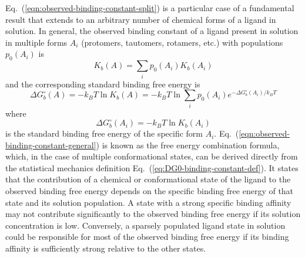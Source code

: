 \documentclass[9pt,bestpractices]{livecoms}
\begin{document}
Eq.~(\ref{eqn:observed-binding-constant-split}) is a particular case of a fundamental result that extends to an arbitrary number of chemical forms of a ligand in solution. In general, the observed binding constant of a ligand present in solution in multiple forms $A_i$ (protomers, tautomers, rotamers, etc.) with populations $p_0(A_i)$ is\cite{khuttan2023taming}
\begin{equation}
  K_b(A) = \sum_i p_0(A_i) K_b(A_i)
  \label{eqn:observed-binding-constant-general}
\end{equation}
and the corresponding standard binding free energy is
\begin{equation}
 \Delta G^\circ_b(A) = -k_B T \ln K_b(A) = -k_B T \ln \sum_i p_0(A_i) e^{-\Delta G^\circ_b(A_i)/k_B T}
  \label{eqn:observed-binding-free-energy-general}
\end{equation}
where
\begin{equation}
\Delta G^\circ_b(A_i) = -k_B T \ln K_b(A_i)
\end{equation}
is the standard binding free energy of the specific form $A_i$. Eq.~(\ref{eqn:observed-binding-constant-general}) is known as the free energy combination formula, which, in the case of multiple conformational states, can be derived directly from the statistical mechanics definition Eq.~(\ref{eq:DG0-binding-constant-def}).\cite{jayachandran2006parallelized,gallicchio2011recent} It states that the contribution of a chemical or conformational state of the ligand to the observed binding free energy depends on the specific binding free energy of that state and its solution population. A state with a strong specific binding affinity may not contribute significantly to the observed binding free energy if its solution concentration is low. Conversely, a sparsely populated ligand state in solution could be responsible for most of the observed binding free energy if its binding affinity is sufficiently strong relative to the other states.\cite{azimi2022application}   
\end{document}
